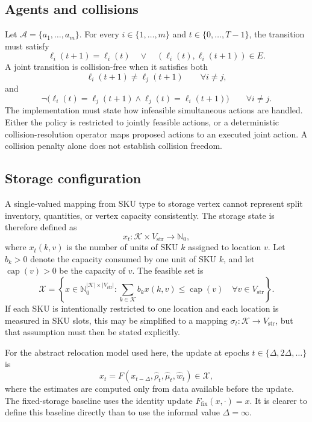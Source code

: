 \documentclass[../main.tex]{subfiles}
\begin{document}
\subsection{Agents and collisions}

Let \(\mathcal{A}=\{a_1,\ldots,a_m\}\). For every \(i\in\{1,\ldots,m\}\) and
\(t\in\{0,\ldots,T-1\}\), the transition must satisfy
\[
\ell_i(t+1)=\ell_i(t)
\quad\lor\quad
(\ell_i(t),\ell_i(t+1))\in E.
\]
A joint transition is collision-free when it satisfies both
\[
\ell_i(t+1)\neq \ell_j(t+1)
\qquad \forall i\neq j,
\]
and
\[
\neg\bigl(
\ell_i(t)=\ell_j(t+1)\land
\ell_j(t)=\ell_i(t+1)
\bigr)
\qquad \forall i\neq j.
\]
The implementation must state how infeasible simultaneous actions are handled.
Either the policy is restricted to jointly feasible actions, or a deterministic
collision-resolution operator maps proposed actions to an executed joint
action. A collision penalty alone does not establish collision freedom.

\subsection{Storage configuration}

A single-valued mapping from SKU type to storage vertex cannot represent split
inventory, quantities, or vertex capacity consistently. The storage state is
therefore defined as
\[
x_t:\mathcal{K}\times V_{\mathrm{str}}\rightarrow\mathbb{N}_0,
\]
where \(x_t(k,v)\) is the number of units of SKU \(k\) assigned to location
\(v\). Let \(b_k>0\) denote the capacity consumed by one unit of SKU \(k\), and
let \(\operatorname{cap}(v)>0\) be the capacity of \(v\). The feasible set is
\[
\mathcal{X}=
\left\{
 x\in\mathbb{N}_0^{|\mathcal{K}|\times|V_{\mathrm{str}}|}:
 \sum_{k\in\mathcal{K}}b_kx(k,v)\leq\operatorname{cap}(v)
 \quad\forall v\in V_{\mathrm{str}}
\right\}.
\]
If each SKU is intentionally restricted to one location and each location is
measured in SKU slots, this may be simplified to a mapping
\(\sigma_t:\mathcal{K}\rightarrow V_{\mathrm{str}}\), but that assumption must
then be stated explicitly.

For the abstract relocation model used here, the update at epochs
\(t\in\{\Delta,2\Delta,\ldots\}\) is
\[
x_t=F(x_{t-\Delta},\widehat\rho_t,\widehat\mu_t,\widehat w_t)
\in\mathcal{X},
\]
where the estimates are computed only from data available before the update.
The fixed-storage baseline uses the identity update
\(F_{\mathrm{fix}}(x,\cdot)=x\). It is clearer to define this baseline directly
than to use the informal value \(\Delta=\infty\).
\end{document}

